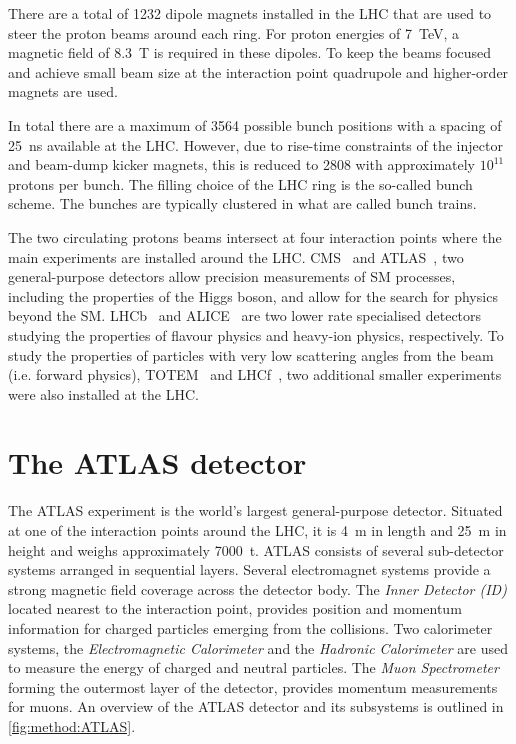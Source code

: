 There are a total of 1232 dipole magnets installed in the LHC that are used to steer the proton beams around each ring. For proton energies of \SI{7}{\tera\eV}, a magnetic field of \SI{8.3}{\tesla} is required in these dipoles. To keep the beams focused and achieve small beam size at the 
interaction point quadrupole and higher-order magnets are used. 

In total there are a maximum of 3564 possible bunch positions with a spacing of \SI{25}{\nano\second} available at the LHC. However, due to rise-time constraints of the injector and beam-dump kicker magnets, this is reduced to 2808 with approximately $10^{11}$ protons per bunch. The filling choice of the LHC ring is the so-called bunch scheme. The bunches are typically clustered in what are called bunch trains.

The two circulating protons beams intersect at four interaction points where the main experiments are installed around the LHC. CMS~\cite{CMS} and ATLAS~\cite{ATLAS}, two general-purpose detectors allow precision measurements of SM processes, including the properties of the Higgs boson, and allow for the search for physics beyond the SM. LHCb~\cite{LHCb} and ALICE~\cite{ALICE} are two lower rate specialised detectors studying the properties of flavour physics and heavy-ion physics, respectively. To study the properties of particles with very low scattering angles from the beam (i.e. forward physics), TOTEM~\cite{totem:2008zza} and LHCf~\cite{LHCf:2008zz}, two additional smaller experiments were also installed at the LHC.

\section{The ATLAS detector}\label{sec:method:ATLAS}

The ATLAS experiment is the world's largest general-purpose detector. Situated at one of the interaction points around the LHC, it is \SI{4}{\meter} in length and \SI{25}{\meter} in height and weighs approximately \SI{7000}{\tonne}. ATLAS consists of several sub-detector systems arranged in sequential layers. Several electromagnet systems provide a strong magnetic field coverage across the detector body. The \emph{Inner Detector (ID)} located nearest to the interaction point, provides position and momentum information for charged particles emerging from the collisions. Two calorimeter systems, the \emph{Electromagnetic Calorimeter} and the \emph{Hadronic Calorimeter} are used to measure the energy of charged and neutral particles. The \emph{Muon Spectrometer} forming the outermost layer of the detector, provides momentum measurements for muons. An overview of the ATLAS detector and its subsystems is outlined in \cref{fig:method:ATLAS}.

